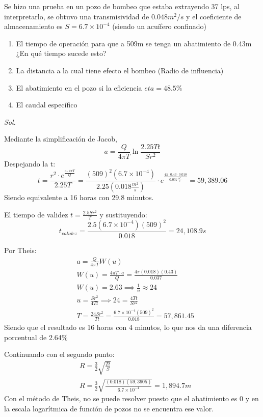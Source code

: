 \begin{example}
    Se hizo una prueba en un pozo de bombeo que estaba extrayendo 37 lps, al interpretarlo, se obtuvo una transmisividad de $0.048m^2/s$ y el coeficiente de almacenamiento es $S= 6.7\times 10^{-4}$ (siendo un acuífero confinado)
\begin{enumerate}
    \item El tiempo de operación para que a 509m se tenga un abatimiento de 0.43m ¿En qué tiempo sucede esto?
    \item La distancia a la cual tiene efecto el bombeo (Radio de influencia)
    \item El abatimiento en el pozo si la eficiencia $eta= 48.5\%$
    \item El caudal específico
\end{enumerate}
\textit{ Sol. }

Mediante la simplificación de Jacob, 
\begin{equation*}
    a = \frac{Q}{4\pi T}\ln{\frac{2.25Tt}{Sr^2}}
\end{equation*}
Despejando la t:
\begin{equation*}
    t = \frac{r^2\cdot e^{\frac{a\cdot 4\pi T}{Q}}}{2.25T} = \frac{(509)^2 \left(6.7 \times 10^{ - 4}\right)}{2.25\left(0.018\frac{m^2}{s}\right)}\cdot e^{\frac{4\pi\cdot 0.43\cdot 0.018}{0.037\frac{m^3}{s}}} = 59,389.06
\end{equation*}
Siendo equivalente a 16 horas con 29.8 minutos.

El tiempo de validez $t= \frac{2.5 Sr^2}{T}$ y sustituyendo:
\begin{equation*}
    t_{validez}= \frac{2.5\left(6.7 \times 10^{ - 4} \right)\left(509\right)^2}{0.018} = 24,108.9s
\end{equation*}

Por Theis: 
\begin{align*}
    &a = \frac{Q}{4\pi T}W(u)\\
    &W(u)= \frac{4 \pi T\cdot  a }{Q} = \frac{4\pi (0.018) (0.43)}{0.037}\\
    &W(u) = 2.63 \implies \frac{1}{u} \approx 24 \\
    &u = \frac{Sr^2}{4Tt} \implies 24 = \frac{4Tt}{Sr^2}\\
    &T = \frac{24Sr^2}{Tt}= \frac{6.7 \times 10^{ - 4}\left(509\right)^2}{0.018} = 57,861.45
\end{align*}
Siendo que el resultado es 16 horas con 4 minutos, lo que nos da una diferencia porcentual de 2.64\%

Continuando con el segundo punto: 
\begin{align*}
    &R = \frac{3}{2} \sqrt{\frac{Tt}{S}}\\
    &R = \frac{3}{2} \sqrt{\frac{(0.018)(59,3905)}{6.7 \times 10^{ - 4}}} = 1,894.7m
\end{align*}
Con el método de Theis, no se puede resolver puesto que el abatimiento es 0 y en la escala logarítmica de función de pozos no se encuentra ese valor.


\end{example}
